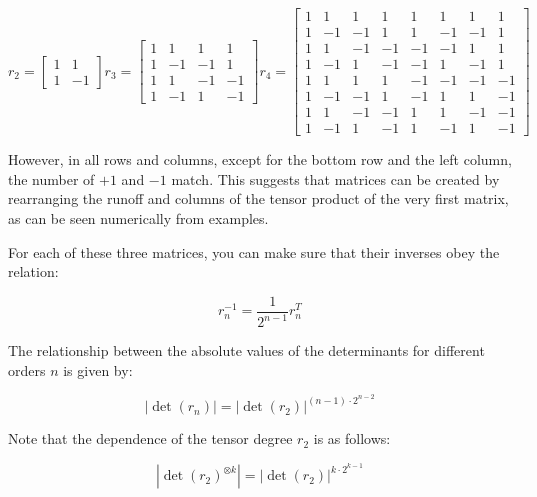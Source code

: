 \documentclass[a4paper, openany, 12pt]{article}
\theoremstyle{remark}
\theoremstyle{definition}
\newcommand{\ot}{\otimes}
\begin{document}
\begin{equation}
r_2 = \begin{bmatrix}1 & 1 \\ 1 & -1\end{bmatrix}
r_3 = \begin{bmatrix}1 & 1 & 1 & 1 \\ 1 & -1 & -1 & 1 \\ 1 & 1 & -1 & -1 \\ 1 & -1 & 1 & -1\end{bmatrix}
r_4 = \begin{bmatrix} 1 & 1 & 1 & 1 & 1 & 1 & 1 & 1\\
1 & -1 & -1 & 1 & 1 & -1 & -1 & 1 \\
1 & 1 & -1 & -1 & -1 & -1 & 1 & 1 \\
1 & -1 & 1 & -1 & -1 & 1 & -1 & 1 \\
1 & 1 & 1 & 1 & -1 & -1 & -1 & -1 \\
1 & -1 & -1 & 1 & -1 & 1 & 1 & -1 \\
1 & 1 & -1 & -1 & 1 & 1 & -1 & -1 \\
1 & -1 & 1 & -1 & 1 & -1 & 1 & -1\end{bmatrix}
\label{eq:matrices}
\end{equation}

However, in all rows and columns, except for the bottom row and the left column, the number of $+1$ and $-1$ match. This suggests that matrices can be created by rearranging the runoff and columns of the tensor product of the very first matrix, as can be seen numerically from examples.

For each of these three matrices, you can make sure that their inverses obey the relation:

\begin{equation}
    r_n^{-1} = \frac{1}{2^{n-1}}r_n^T
    \label{eq:r_n_minus1}
\end{equation}

The relationship between the absolute values of the determinants for different orders $n$ is given by:

\begin{equation}
    |\det(r_n)| = |\det(r_2)|^{(n-1)\cdot2^{n-2}}
\end{equation}

Note that the dependence of the tensor degree $r_2$ is as follows:

\begin{equation}
    |\det(r_2)^{\ot k}| = |\det(r_2)|^{k\cdot2^{k-1}}
\end{equation}
\end{document}
